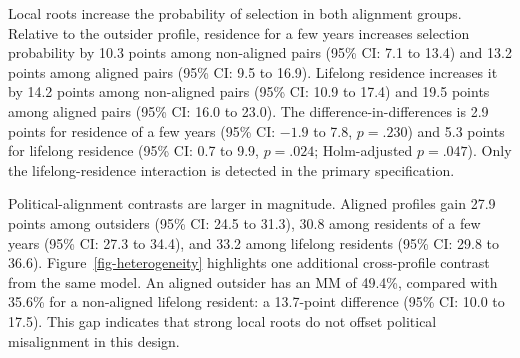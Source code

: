 \documentclass[
  letterpaper,
  DIV=11,
  numbers=noendperiod]{scrartcl}
\newcommand{\criticmarkupadd}[1]{#1}
\newcommand{\criticmarkuprm}[1]{}
\begin{document}
\criticmarkuprm{The municipal-statement contrasts are
positive}\criticmarkupadd{Local roots increase the probability of
selection} in both alignment groups. Relative to the
\criticmarkuprm{outsider-with-local-knowledge statement, the
few-years-resident statement}\criticmarkupadd{outsider profile,
residence for a few years} increases selection
\criticmarkupadd{probability }by 10.3 points among non-aligned pairs
(95\% CI: 7.1 to 13.4) and 13.2 points among aligned pairs (95\% CI: 9.5
to 16.9). \criticmarkuprm{Relative to the same outsider statement, the
lifelong-resident statement}\criticmarkupadd{Lifelong residence}
increases \criticmarkuprm{selection}\criticmarkupadd{it} by 14.2 points
among non-aligned pairs (95\% CI: 10.9 to 17.4) and 19.5 points among
aligned pairs (95\% CI: 16.0 to 23.0). The difference-in-differences is
2.9 points for \criticmarkuprm{the few-years-resident
statement}\criticmarkupadd{residence of a few years} (95\% CI: \(-1.9\)
to 7.8, \(p=.230\)) and 5.3 points for \criticmarkuprm{the
lifelong-resident statement}\criticmarkupadd{lifelong residence} (95\%
CI: 0.7 to 9.9, \(p=.024\); Holm-adjusted \(p=.047\)).
\criticmarkuprm{The}\criticmarkupadd{Only the lifelong-residence}
interaction is \criticmarkuprm{therefore
concentrated}\criticmarkupadd{detected} in the
\criticmarkuprm{lifelong-resident-statement
contrast.}\criticmarkupadd{primary specification.}

\criticmarkuprm{Government alignment
has}\criticmarkupadd{Political-alignment contrasts are} larger
\criticmarkuprm{point estimates.}\criticmarkupadd{in magnitude.} Aligned
profiles gain 27.9 points among outsiders (95\% CI: 24.5 to 31.3), 30.8
among residents of a few years (95\% CI: 27.3 to 34.4), and 33.2 among
lifelong residents (95\% CI: 29.8 to \criticmarkuprm{36.6).Figure
3}\criticmarkupadd{36.6). Figure~\ref{fig-heterogeneity}} highlights one
additional cross-profile contrast from the same model. An aligned
\criticmarkuprm{profile with the outsider-with-local-knowledge
statement}\criticmarkupadd{outsider} has an MM of 49.4\%, compared with
35.6\% for a non-aligned \criticmarkuprm{profile with the
lifelong-resident statement:}\criticmarkupadd{lifelong resident:} a
13.7-point \criticmarkuprm{cross-profile }difference (95\% CI: 10.0 to
\criticmarkuprm{17.5).}\criticmarkupadd{17.5). This gap indicates that
strong local roots do not offset political misalignment in this design.}
\end{document}
